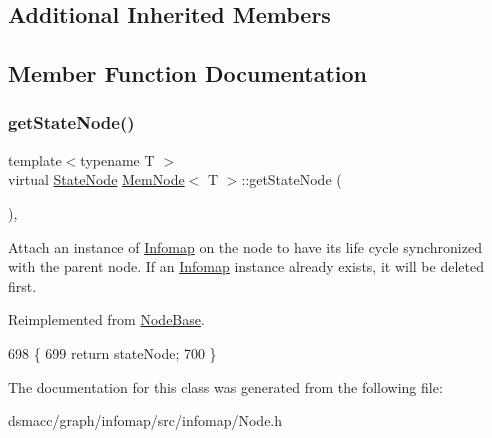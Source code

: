 \subsection*{Additional Inherited Members}


\subsection{Member Function Documentation}
\mbox{\label{classMemNode_a60aac298830b3ad469b8fae1ae21a1d0}} 
\subsubsection{\texorpdfstring{get\+State\+Node()}{getStateNode()}}
{\footnotesize\ttfamily template$<$typename T $>$ \\
virtual \mbox{\hyperlink{structStateNode}{State\+Node}} \mbox{\hyperlink{classMemNode}{Mem\+Node}}$<$ T $>$\+::get\+State\+Node (\begin{DoxyParamCaption}{ }\end{DoxyParamCaption})\hspace{0.3cm}{\ttfamily [inline]}, {\ttfamily [virtual]}}

Attach an instance of \mbox{\hyperlink{classInfomap}{Infomap}} on the node to have its life cycle synchronized with the parent node.  If an \mbox{\hyperlink{classInfomap}{Infomap}} instance already exists, it will be deleted first. 

Reimplemented from \mbox{\hyperlink{classNodeBase_a1ea5960eead0b46f37108713eb8f2200}{Node\+Base}}.


\begin{DoxyCode}
698     \{
699         \textcolor{keywordflow}{return} stateNode;
700     \}
\end{DoxyCode}


The documentation for this class was generated from the following file\+:\begin{DoxyCompactItemize}
\item 
dsmacc/graph/infomap/src/infomap/Node.\+h\end{DoxyCompactItemize}
